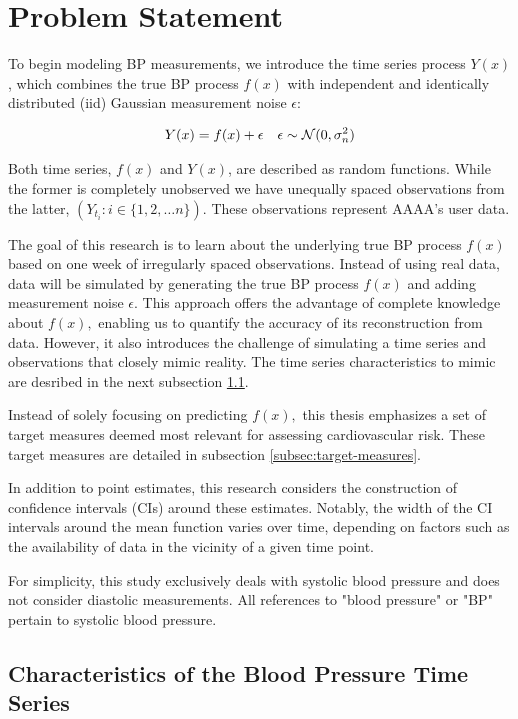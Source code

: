 \section{Problem Statement}

To begin modeling BP measurements, we introduce the time series process $Y(x)$,
which combines the true BP process $f(x)$ with independent and identically
distributed (iid) Gaussian measurement noise $\epsilon$:

\begin{align*}
    Y(x) = f(x) + \epsilon && \epsilon \sim \operatorname{\mathcal{N}}(0, \sigma_n^{2})
\end{align*}

Both time series, $f(x)$ and $Y(x)$, are described as random functions.
While the former is completely unobserved we have
unequally spaced observations from the latter, $(Y_{t_i}: i \in \{1, 2, \dots n\})$.
These observations represent AAAA's user data.

The goal of this research is to learn about the underlying true BP process
$f(x)$ based on one week of irregularly spaced observations.
Instead of using real data, data will be simulated by generating the true BP
process $f(x)$ and adding measurement noise $\epsilon$.
This approach offers the advantage of
complete knowledge about $f(x),$ enabling us to quantify the accuracy of its
reconstruction from data. However, it also introduces the challenge of simulating
a time series and observations that closely mimic reality.
The time series characteristics to mimic are desribed in the next subsection
\ref{sec:characteristics-of-the-blood-pressure-time-series}.

Instead of solely focusing on predicting $f(x),$ this thesis emphasizes a set of
target measures deemed most relevant for assessing cardiovascular risk. These
target measures are detailed in subsection \ref{subsec:target-measures}.

In addition to point estimates, this research considers the construction of
confidence intervals (CIs) around these estimates. Notably, the width of the CI
intervals around the mean function varies over time, depending on factors such as
the availability of data in the vicinity of a given time point.

For simplicity, this study exclusively deals with systolic blood pressure and does
not consider diastolic measurements. All references to "blood pressure" or "BP"
pertain to systolic blood pressure.


\subsection{Characteristics of the Blood Pressure Time Series}\label{sec:characteristics-of-the-blood-pressure-time-series}

